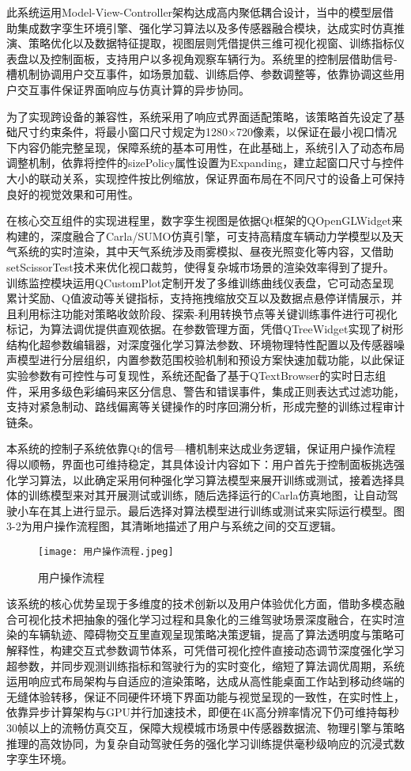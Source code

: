 此系统运用Model-View-Controller架构达成高内聚低耦合设计，当中的模型层借助集成数字孪生环境引擎、强化学习算法以及多传感器融合模块，达成实时仿真推演、策略优化以及数据特征提取，视图层则凭借提供三维可视化视窗、训练指标仪表盘以及控制面板，支持用户以多视角观察车辆行为。系统里的控制层借助信号-槽机制协调用户交互事件，如场景加载、训练启停、参数调整等，依靠协调这些用户交互事件保证界面响应与仿真计算的异步协同。

为了实现跨设备的兼容性，系统采用了响应式界面适配策略，该策略首先设定了基础尺寸约束条件，将最小窗口尺寸规定为1280×720像素，以保证在最小视口情况下内容仍能完整呈现，保障系统的基本可用性，在此基础上，系统引入了动态布局调整机制，依靠将控件的sizePolicy属性设置为Expanding，建立起窗口尺寸与控件大小的联动关系，实现控件按比例缩放，保证界面布局在不同尺寸的设备上可保持良好的视觉效果和可用性。

在核心交互组件的实现进程里，数字孪生视图是依据Qt框架的QOpenGLWidget来构建的，深度融合了Carla/SUMO仿真引擎，可支持高精度车辆动力学模型以及天气系统的实时渲染，其中天气系统涉及雨雾模拟、昼夜光照变化等内容，又借助setScissorTest技术来优化视口裁剪，使得复杂城市场景的渲染效率得到了提升。训练监控模块运用QCustomPlot定制开发了多维训练曲线仪表盘，它可动态呈现累计奖励、Q值波动等关键指标，支持拖拽缩放交互以及数据点悬停详情展示，并且利用标注功能对策略收敛阶段、探索-利用转换节点等关键训练事件进行可视化标记，为算法调优提供直观依据。在参数管理方面，凭借QTreeWidget实现了树形结构化超参数编辑器，对深度强化学习算法参数、环境物理特性配置以及传感器噪声模型进行分层组织，内置参数范围校验机制和预设方案快速加载功能，以此保证实验参数有可控性与可复现性，系统还配备了基于QTextBrowser的实时日志组件，采用多级色彩编码来区分信息、警告和错误事件，集成正则表达式过滤功能，支持对紧急制动、路线偏离等关键操作的时序回溯分析，形成完整的训练过程审计链条。


本系统的控制子系统依靠Qt的信号—槽机制来达成业务逻辑，保证用户操作流程得以顺畅，界面也可维持稳定，其具体设计内容如下：用户首先于控制面板挑选强化学习算法，以此确定采用何种强化学习算法模型来展开训练或测试，接着选择具体的训练模型来对其开展测试或训练，随后选择运行的Carla仿真地图，让自动驾驶小车在其上进行显示。最后选择对算法模型进行训练或测试来实际运行模型。图3-2为用户操作流程图，其清晰地描述了用户与系统之间的交互逻辑。

\begin{figure}[hbt]
	\centering
	\texttt{[image: 用户操作流程.jpeg]}
	\caption{用户操作流程}
	\label{f.example}
\end{figure}

该系统的核心优势呈现于多维度的技术创新以及用户体验优化方面，借助多模态融合可视化技术把抽象的强化学习过程和具象化的三维驾驶场景深度融合，在实时渲染的车辆轨迹、障碍物交互里直观呈现策略决策逻辑，提高了算法透明度与策略可解释性，构建交互式参数调节体系，可凭借可视化控件直接动态调节深度强化学习超参数，并同步观测训练指标和驾驶行为的实时变化，缩短了算法调优周期，系统运用响应式布局架构与自适应的渲染策略，达成从高性能桌面工作站到移动终端的无缝体验转移，保证不同硬件环境下界面功能与视觉呈现的一致性，在实时性上，依靠异步计算架构与GPU并行加速技术，即便在4K高分辨率情况下仍可维持每秒30帧以上的流畅仿真交互，保障大规模城市场景中传感器数据流、物理引擎与策略推理的高效协同，为复杂自动驾驶任务的强化学习训练提供毫秒级响应的沉浸式数字孪生环境。

